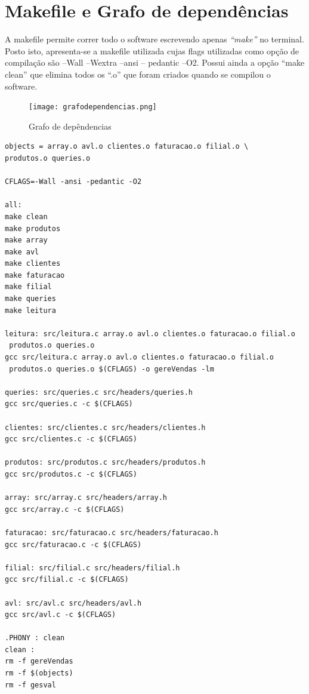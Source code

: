 \chapter{Makefile e Grafo de dependências}
A makefile permite correr todo o software escrevendo apenas \textit{“make”} no terminal. Posto isto, apresenta-se a makefile utilizada cujas flags utilizadas como opção de compilação são –Wall –Wextra –ansi – pedantic –O2.
Possui ainda a opção “make clean” que elimina todos os “.o” que foram criados quando se compilou o software.

\begin{figure}[h!]
	\centering
	\texttt{[image: grafodependencias.png]}  
	\caption{Grafo de depêndencias}  
\end{figure}

\begin{verbatim}
objects = array.o avl.o clientes.o faturacao.o filial.o \
produtos.o queries.o 

CFLAGS=-Wall -ansi -pedantic -O2

all:
make clean
make produtos
make array
make avl
make clientes
make faturacao
make filial
make queries
make leitura

leitura: src/leitura.c array.o avl.o clientes.o faturacao.o filial.o
 produtos.o queries.o 
gcc src/leitura.c array.o avl.o clientes.o faturacao.o filial.o
 produtos.o queries.o $(CFLAGS) -o gereVendas -lm

queries: src/queries.c src/headers/queries.h
gcc src/queries.c -c $(CFLAGS)

clientes: src/clientes.c src/headers/clientes.h
gcc src/clientes.c -c $(CFLAGS)

produtos: src/produtos.c src/headers/produtos.h
gcc src/produtos.c -c $(CFLAGS)

array: src/array.c src/headers/array.h
gcc src/array.c -c $(CFLAGS)

faturacao: src/faturacao.c src/headers/faturacao.h
gcc src/faturacao.c -c $(CFLAGS)

filial: src/filial.c src/headers/filial.h
gcc src/filial.c -c $(CFLAGS)

avl: src/avl.c src/headers/avl.h
gcc src/avl.c -c $(CFLAGS)

.PHONY : clean
clean :
rm -f gereVendas
rm -f $(objects)
rm -f gesval
\end{verbatim}
